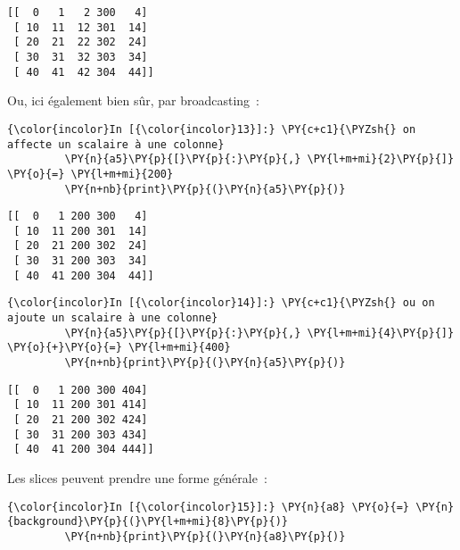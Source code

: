     \begin{Verbatim}[commandchars=\\\{\},frame=single,framerule=0.3mm,rulecolor=\color{cellframecolor}]
[[  0   1   2 300   4]
 [ 10  11  12 301  14]
 [ 20  21  22 302  24]
 [ 30  31  32 303  34]
 [ 40  41  42 304  44]]
\end{Verbatim}

    Ou, ici également bien sûr, par broadcasting~:

    \begin{Verbatim}[commandchars=\\\{\},frame=single,framerule=0.3mm,rulecolor=\color{cellframecolor}]
{\color{incolor}In [{\color{incolor}13}]:} \PY{c+c1}{\PYZsh{} on affecte un scalaire à une colonne}
         \PY{n}{a5}\PY{p}{[}\PY{p}{:}\PY{p}{,} \PY{l+m+mi}{2}\PY{p}{]} \PY{o}{=} \PY{l+m+mi}{200}
         \PY{n+nb}{print}\PY{p}{(}\PY{n}{a5}\PY{p}{)}
\end{Verbatim}


    \begin{Verbatim}[commandchars=\\\{\},frame=single,framerule=0.3mm,rulecolor=\color{cellframecolor}]
[[  0   1 200 300   4]
 [ 10  11 200 301  14]
 [ 20  21 200 302  24]
 [ 30  31 200 303  34]
 [ 40  41 200 304  44]]
\end{Verbatim}

    \begin{Verbatim}[commandchars=\\\{\},frame=single,framerule=0.3mm,rulecolor=\color{cellframecolor}]
{\color{incolor}In [{\color{incolor}14}]:} \PY{c+c1}{\PYZsh{} ou on ajoute un scalaire à une colonne}
         \PY{n}{a5}\PY{p}{[}\PY{p}{:}\PY{p}{,} \PY{l+m+mi}{4}\PY{p}{]} \PY{o}{+}\PY{o}{=} \PY{l+m+mi}{400}
         \PY{n+nb}{print}\PY{p}{(}\PY{n}{a5}\PY{p}{)}
\end{Verbatim}


    \begin{Verbatim}[commandchars=\\\{\},frame=single,framerule=0.3mm,rulecolor=\color{cellframecolor}]
[[  0   1 200 300 404]
 [ 10  11 200 301 414]
 [ 20  21 200 302 424]
 [ 30  31 200 303 434]
 [ 40  41 200 304 444]]
\end{Verbatim}

    Les slices peuvent prendre une forme générale~:

    \begin{Verbatim}[commandchars=\\\{\},frame=single,framerule=0.3mm,rulecolor=\color{cellframecolor}]
{\color{incolor}In [{\color{incolor}15}]:} \PY{n}{a8} \PY{o}{=} \PY{n}{background}\PY{p}{(}\PY{l+m+mi}{8}\PY{p}{)}
         \PY{n+nb}{print}\PY{p}{(}\PY{n}{a8}\PY{p}{)}
\end{Verbatim}


